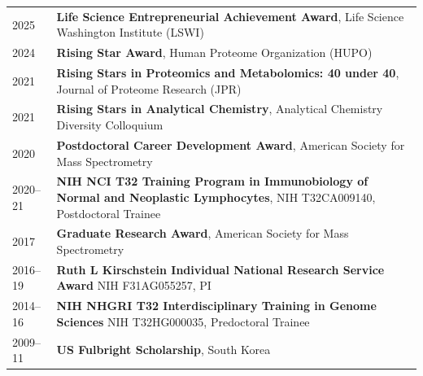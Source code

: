 \documentclass[11pt]{article}
\begin{document}
\begin{tabular}{V}
  2025     & {\bf Life Science Entrepreneurial Achievement Award}, Life Science Washington Institute  (LSWI) \\
  2024     & {\bf Rising Star Award}, Human Proteome Organization (HUPO) \\
  2021     & {\bf Rising Stars in Proteomics and Metabolomics: 40 under 40}, Journal of Proteome Research (JPR) \\
  2021     & {\bf Rising Stars in Analytical Chemistry}, Analytical Chemistry Diversity Colloquium \\
  2020     & {\bf Postdoctoral Career Development Award},  American Society for Mass Spectrometry\\ 
  2020--21   & {\bf NIH NCI T32 Training Program in Immunobiology of Normal and Neoplastic Lymphocytes}, 
            \newline NIH T32CA009140, Postdoctoral Trainee\\
  2017     & {\bf Graduate Research Award}, American Society for Mass Spectrometry\\
  2016--19 & {\bf Ruth L Kirschstein Individual National Research Service Award}
             \newline NIH F31AG055257, PI\\
  2014--16 & {\bf NIH NHGRI T32 Interdisciplinary Training in Genome Sciences}
             \newline NIH T32HG000035, Predoctoral Trainee\\
  2009--11  & {\bf US Fulbright Scholarship}, South Korea\\ 
\end{tabular}
\end{document}
